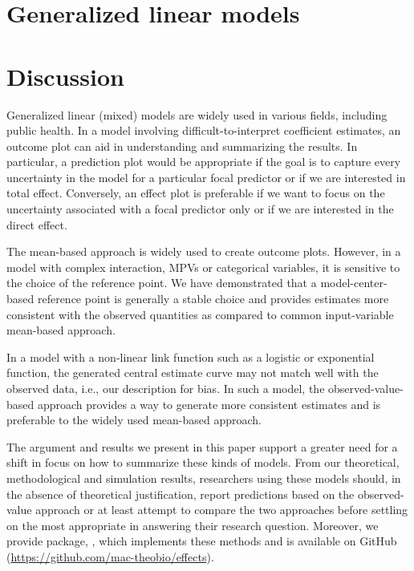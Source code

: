 \section{Generalized linear models}

\section{Discussion}

Generalized linear (mixed) models are widely used in various fields, including public health. In a model involving difficult-to-interpret coefficient estimates, an outcome plot can aid in understanding and summarizing the results. In particular, a prediction plot would be appropriate if the goal is to capture every uncertainty in the model for a particular focal predictor or if we are interested in total effect. Conversely, an effect plot is preferable if we want to focus on the uncertainty associated with a focal predictor only or if we are interested in the direct effect.

The mean-based approach is widely used to create outcome plots. However, in a model with complex interaction, MPVs or categorical variables, it is sensitive to the choice of the reference point. We have demonstrated that a model-center-based reference point is generally a stable choice and provides estimates more consistent with the observed quantities as compared to common input-variable mean-based approach.

In a model with a non-linear link function such as a logistic or exponential function, the generated central estimate curve may not match well with the observed data, i.e., our description for bias. In such a model, the observed-value-based approach provides a way to generate more consistent estimates and is preferable to the widely used mean-based approach.

The argument and results we present in this paper support a greater need for a shift in focus on how to summarize these kinds of models. From our theoretical, methodological and simulation results, researchers using these models should, in the absence of theoretical justification, report predictions based on the observed-value approach or at least attempt to compare the two approaches before settling on the most appropriate in answering their research question. Moreover, we provide  package, , which implements these methods and is available on GitHub (\href{https://github.com/mac-theobio/effects}{https://github.com/mac-theobio/effects}).


